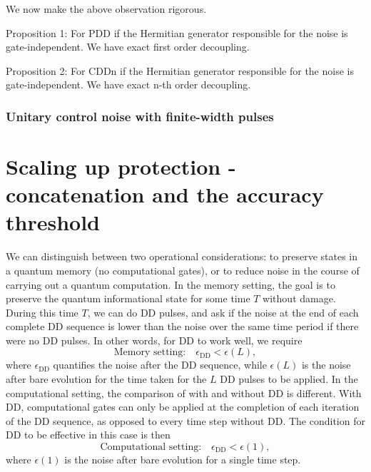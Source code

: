 \documentclass[pra,reprint,superscriptaddress]{revtex4-2}
\begin{document}
We now make the above observation rigorous. 

Proposition 1: For PDD if the Hermitian generator responsible for the noise is gate-independent. We have exact first order decoupling. 

Proposition 2: For CDDn if the Hermitian generator responsible for the noise is gate-independent. We have exact n-th order decoupling. 

\subsubsection{Unitary control noise with finite-width pulses}





\newpage
\section{Scaling up protection - concatenation and the accuracy threshold}\label{sec:threshold}
We can distinguish between two operational considerations: to preserve states in a quantum memory (no computational gates), or to reduce noise in the course of carrying out a quantum computation. In the memory setting, the goal is to preserve the quantum informational state for some time $T$ without damage. During this time $T$, we can do DD pulses, and ask if the noise at the end of each complete DD sequence is lower than the noise over the same time period if there were no DD pulses. In other words, for DD to work well, we require
\begin{equation}
\textrm{Memory setting:}\quad \epsilon_\mathrm{DD}<\epsilon(L),
\end{equation}
where $\epsilon_\mathrm{DD}$ quantifies the noise after the DD sequence, while $\epsilon(L)$ is the noise after bare evolution for the time taken for the $L$ DD pulses to be applied.
In the computational setting, the comparison of with and without DD is different. With DD, computational gates can only be applied at the completion of each iteration of the DD sequence, as opposed to every time step without DD. The condition for DD to be effective in this case is then
\begin{equation}\label{eq:cond}
\textrm{Computational setting:}\quad\epsilon_\mathrm{DD}<\epsilon(1),
\end{equation}
where $\epsilon(1)$ is the noise after bare evolution for a single time step. 
\end{document}
